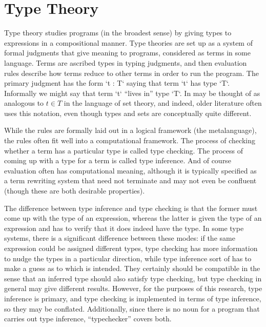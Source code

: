 \documentclass[11pt, twoside, reqno]{book}
\begin{document}

\section{Type Theory}
\label{TT}

Type theory studies programs (in the broadest sense) by giving types to expressions in a compositional manner.
Type theories are set up as a system of formal judgments that give meaning to programs, considered as terms in some language.
Terms are ascribed types in typing judgments, and then evaluation rules describe how terms reduce to other terms in order to run the program.
The primary judgment has the form \inHS`t : T` saying that term \inHS`t` has type \inHS`T`.
Informally we might say that term \inHS`t` ``lives in'' type \inHS`T`.
In may be thought of as analogous to $t \in T$ in the language of set theory, and indeed, older literature often uses this notation, even though types and sets are conceptually quite different.

While the rules are formally laid out in a logical framework (the metalanguage), the rules often fit well into a computational framework.
The process of checking whether a term has a particular type is called type checking.
The process of coming up with a type for a term is called type inference.
And of course evaluation often has computational meaning, although it is typically specified as a term rewriting system that need not terminate and may not even be confluent (though these are both desirable properties).

The difference between type inference and type checking is that the former must come up with the type of an expression, whereas the latter is given the type of an expression and has to verify that it does indeed have the type.
In some type systems, there is a significant difference between these modes: if the same expression could be assigned different types, type checking has more information to nudge the types in a particular direction, while type inference sort of has to make a guess as to which is intended.
They certainly should be compatible in the sense that an inferred type should also satisfy type checking, but type checking in general may give different results.
However, for the purposes of this research, type inference is primary, and type checking is implemented in terms of type inference, so they may be conflated.
Additionally, since there is no noun for a program that carries out type inference, ``typechecker'' covers both.
\end{document}
